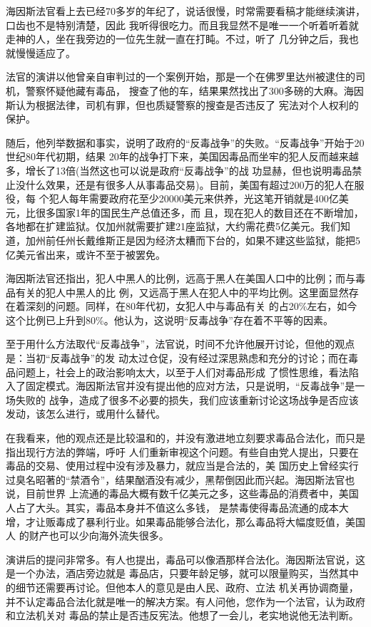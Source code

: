 ﻿\documentclass[11pt]{article}
\begin{document}
海因斯法官看上去已经70多岁的年纪了，说话很慢，时常需要看稿才能继续演讲，口齿也不是特别清楚，因此
我听得很吃力。而且我显然不是唯一一个听着听着就走神的人，坐在我旁边的一位先生就一直在打盹。不过，听了
几分钟之后，我也就慢慢适应了。

法官的演讲以他曾亲自审判过的一个案例开始，那是一个在佛罗里达州被逮住的司机，警察怀疑他藏有毒品，
搜查了他的车，结果果然找出了300多磅的大麻。海因斯认为根据法律，司机有罪，但也质疑警察的搜查是否违反了
宪法对个人权利的保护。

随后，他列举数据和事实，说明了政府的``反毒战争''的失败。``反毒战争''开始于20世纪80年代初期，结果
20年的战争打下来，美国因毒品而坐牢的犯人反而越来越多，增长了13倍(当然这也可以说是政府``反毒战争''的战
功显赫，但也说明毒品禁止没什么效果，还是有很多人从事毒品交易)。目前，美国有超过200万的犯人在服役，每
个犯人每年需要政府花至少20000美元来供养，光这笔开销就是400亿美元，比很多国家1年的国民生产总值还多，而
且，现在犯人的数目还在不断增加，各地都在扩建监狱。仅加州就需要扩建21座监狱，大约需花费5亿美元。我们知
道，加州前任州长戴维斯正是因为经济太糟而下台的，如果不建这些监狱，能把5亿美元省出来，或许不至于被罢免。

海因斯法官还指出，犯人中黑人的比例，远高于黑人在美国人口中的比例；而与毒品有关的犯人中黑人的比
例，又远高于黑人在犯人中的平均比例。这里面显然存在着深刻的问题。同样，在80年代初，女犯人中与毒品有关
的占20\%左右，如今这个比例已上升到80\%。他认为，这说明``反毒战争''存在着不平等的因素。

至于用什么方法取代``反毒战争''，法官说，时间不允许他展开讨论，但他的观点是：当初``反毒战争''的发
动太过仓促，没有经过深思熟虑和充分的讨论；而在毒品问题上，社会上的政治影响太大，以至于人们对毒品形成
了惯性思维，看法陷入了固定模式。海因斯法官并没有提出他的应对方法，只是说明，``反毒战争''是一场失败的
战争，造成了很多不必要的损失，我们应该重新讨论这场战争是否应该发动，该怎么进行，或用什么替代。

在我看来，他的观点还是比较温和的，并没有激进地立刻要求毒品合法化，而只是指出现行方法的弊端，呼吁
人们重新审视这个问题。有些自由党人提出，只要在毒品的交易、使用过程中没有涉及暴力，就应当是合法的，美
国历史上曾经实行过臭名昭著的``禁酒令''，结果酗酒没有减少，黑帮倒因此而兴起。海因斯法官也说，目前世界
上流通的毒品大概有数千亿美元之多，这些毒品的消费者中，美国人占了大头。其实，毒品本身并不值这么多钱，
是禁毒使得毒品流通的成本大增，才让贩毒成了暴利行业。如果毒品能够合法化，那么毒品将大幅度贬值，美国人
的财产也可以少向海外流失很多。

演讲后的提问非常多。有人也提出，毒品可以像酒那样合法化。海因斯法官说，这是一个办法，酒店旁边就是
毒品店，只要年龄足够，就可以限量购买，当然其中的细节还需要再讨论。但他本人的意见是由人民、政府、立法
机关再协调商量，并不认定毒品合法化就是唯一的解决方案。有人问他，您作为一个法官，认为政府和立法机关对
毒品的禁止是否违反宪法。他想了一会儿，老实地说他无法判断。
\end{document}
